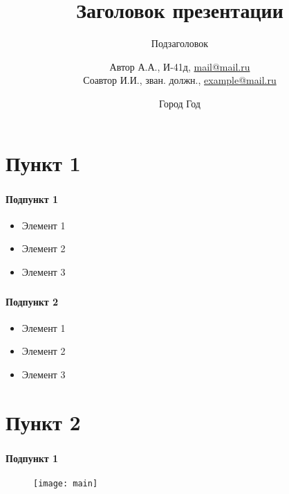 \title{Заголовок презентации}
\subtitle{Подзаголовок}

\author[Автор А.\:А. Соавтор И.\:И.]{
Автор А.\:А., И-41д,
\href{mailto:mail@mail.ru}{mail@mail.ru} \\
Соавтор И.\:И., зван. должн., \href{mailto:example@mail.ru}{example@mail.ru}
}
\date{Город Год}



\frame[plain]{\titlepage} %


\section{Пункт 1}

\begin{frame}
\frametitle{\insertsection}
\framesubtitle{Подпункт 1}
\begin{itemize}
	\item Элемент 1
	\item Элемент 2
	\item Элемент 3
\end{itemize}
\end{frame}

\begin{frame}
\frametitle{\insertsection}
\framesubtitle{Подпункт 2}
\begin{itemize}
	\item Элемент 1
	\item Элемент 2
	\item Элемент 3
\end{itemize}
\end{frame}

\section{Пункт 2}

\begin{frame}
\frametitle{\insertsection}
\framesubtitle{Подпункт 1}
\begin{figure}[h]
	\begin{center}
		\texttt{[image: main]}
	 \end{center}
\end{figure}
\end{frame}

